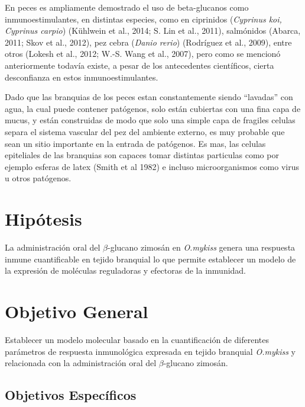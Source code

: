 \documentclass[12pt,a4paper,]{article}
\begin{document}
En peces es ampliamente demostrado el uso de beta-glucanos como
inmunoestimulantes, en distintas especies, como en ciprinidos
(\emph{Cyprinus koi, Cyprinus carpio}) (Kühlwein et al., 2014; S. Lin et
al., 2011)⁠, salmónidos (Abarca, 2011; Skov et al., 2012)⁠, pez cebra
(\emph{Danio rerio}) (Rodríguez et al., 2009), entre otros (Lokesh et
al., 2012; W.-S. Wang et al., 2007), pero como se mencionó anteriormente
todavía existe, a pesar de los antecedentes científicos, cierta
desconfianza en estos inmunoestimulantes.

Dado que las branquias de los peces estan constantemente siendo
``lavadas'' con agua, la cual puede contener patógenos, solo están
cubiertas con una fina capa de mucus, y están construidas de modo que
solo una simple capa de fragiles celulas separa el sistema vascular del
pez del ambiente externo, es muy probable que sean un sitio importante
en la entrada de patógenos. Es mas, las celulas epiteliales de las
branquias son capaces tomar distintas particulas como por ejemplo
esferas de latex (Smith et al 1982) e incluso microorganismos como virus
u otros patógenos.

\clearpage

\section{Hipótesis}\label{hipuxf3tesis}

La administración oral del $\beta$-glucano zimosán en \emph{O.mykiss}
genera una respuesta inmune cuantificable en tejido branquial lo que
permite establecer un modelo de la expresión de moléculas reguladoras y
efectoras de la inmunidad.

\section{Objetivo General}\label{objetivo-general}

Establecer un modelo molecular basado en la cuantificación de diferentes
parámetros de respuesta inmunológica expresada en tejido branquial
\emph{O.mykiss} y relacionada con la administración oral del
$\beta$-glucano zimosán.

\subsection{Objetivos Específicos}\label{objetivos-especuxedficos}
\end{document}
